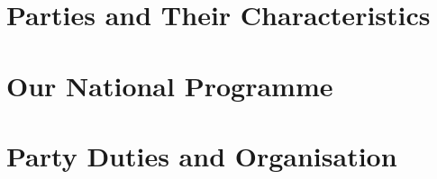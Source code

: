 \section{Parties and Their Characteristics}

\section{Our National Programme}

\section{Party Duties and Organisation}